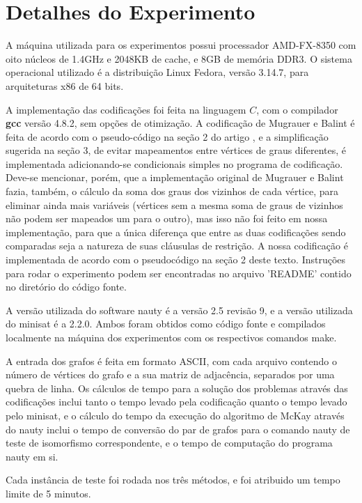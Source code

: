 \documentclass[12pt,a4paper]{article}
\begin{document}
\section{Detalhes do Experimento}

A máquina utilizada para os experimentos possui processador AMD-FX-8350 com oito núcleos de 1.4GHz e 2048KB de cache, e 8GB de 
memória DDR3. O sistema operacional utilizado é a distribuição Linux Fedora, versão 3.14.7, para arquiteturas x86 de 64 bits.

A implementação das codificações foi feita na linguagem $C$, com o compilador \textbf{gcc} versão 4.8.2, sem opções de otimização. 
A codificação de Mugrauer e Balint é feita de acordo com o pseudo-código na seção 2 do artigo \citep{MugrauerBalint}, e a simplificação
sugerida na seção 3, de evitar mapeamentos entre vértices de graus diferentes, é implementada adicionando-se condicionais simples no 
programa de codificação. Deve-se mencionar, porém, que a implementação original de Mugrauer e Balint fazia, também, o cálculo da 
soma dos graus dos vizinhos de cada vértice, para eliminar ainda mais variáveis (vértices sem a mesma soma de graus de vizinhos não 
podem ser mapeados um para o outro), mas isso não foi feito em nossa implementação, para que a única diferença que entre as 
duas codificações sendo comparadas seja a natureza de suas cláusulas de restrição. A nossa codificação é implementada de acordo 
com o pseudocódigo na seção 2 deste texto. Instruções para rodar o experimento podem ser encontradas no arquivo 'README' contido
no diretório do código fonte.

A versão utilizada do software nauty é a versão 2.5 revisão 9, e a versão utilizada do minisat é a 
2.2.0. Ambos foram obtidos como código fonte e compilados localmente na máquina dos experimentos com os respectivos comandos make.

A entrada dos grafos é feita em formato ASCII, com cada arquivo contendo o número de vértices do grafo e a sua matriz de 
adjacência, separados por uma quebra de linha. Os cálculos de tempo para a solução dos problemas através das codificações inclui tanto 
o tempo levado pela codificação quanto o tempo levado pelo minisat, e o cálculo do tempo da execução do algoritmo de McKay através do 
nauty inclui o tempo de conversão do par de grafos para o comando nauty de teste de isomorfismo correspondente, e o tempo de computação 
do programa nauty em si.

Cada instância de teste foi rodada nos três métodos, e foi atribuido um tempo limite de 5 minutos.
\end{document}
